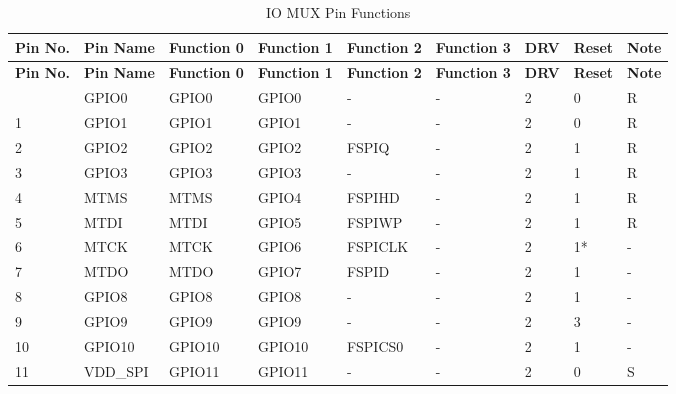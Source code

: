 
   \begin{longtable}[c]{|p{0.7cm}|p{1.9cm}|p{1.9cm}|p{1.7cm}|p{1.7cm}|p{1.7cm}|p{1cm}|p{1cm}|p{1.0cm}| }
   \caption{IO MUX Pin Functions}
    \label{tab:iomuxgpio-pin-functions} \\
        \hline
        \rowcolor{lightgray}
\textbf{Pin No.} & \textbf{Pin Name} & \textbf{Function 0} & \textbf{Function 1} & \textbf{Function 2} & \textbf{Function 3} & \textbf{DRV} & \textbf{Reset} & \textbf{Note} \\
 \hline
\endfirsthead
        \hline
        \rowcolor{lightgray}
        \textbf{Pin No.} & \textbf{Pin Name} & \textbf{Function 0} & \textbf{Function 1} & \textbf{Function 2} & \textbf{Function 3} & \textbf{DRV} & \textbf{Reset} & \textbf{Note} \\
        \hline
        \endhead
        \endfoot
0 & GPIO0     & GPIO0         & GPIO0   & -          & -            & 2           & 0 & R \\ \hline
1 & GPIO1     & GPIO1         & GPIO1   & -          & -            & 2           & 0 & R \\ \hline
2 & GPIO2            & GPIO2         & GPIO2   & FSPIQ      & -            & 2           & 1 & R \\ \hline
3 & GPIO3            & GPIO3         & GPIO3   & -          & -            & 2           & 1 & R \\ \hline
4 & MTMS             & MTMS          & GPIO4   & FSPIHD     & -            & 2           & 1 & R \\ \hline
5 & MTDI             & MTDI          & GPIO5   & FSPIWP     & -            & 2           & 1 & R \\ \hline
6 & MTCK             & MTCK          & GPIO6   & FSPICLK    & -            & 2           & 1* & - \\ \hline
7 & MTDO             & MTDO          & GPIO7   & FSPID      & -            & 2           & 1 & - \\ \hline
8 & GPIO8            & GPIO8         & GPIO8   & -          & -            & 2           & 1 & - \\ \hline
9 & GPIO9            & GPIO9         & GPIO9   & -          & -            & 2           & 3 & - \\ \hline
10 & GPIO10          &  GPIO10       & GPIO10  & FSPICS0    & -            & 2           & 1 & - \\ \hline
11 & VDD\_SPI        &  GPIO11       & GPIO11  & -          & -            & 2           & 0 & S \\ \hline

\end{longtable}
